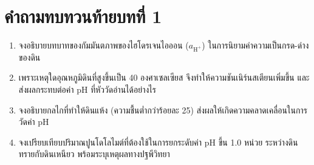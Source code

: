 \section*{คำถามทบทวนท้ายบทที่ 1}

\begin{enumerate}
    \item จงอธิบายบทบาทของกัมมันตภาพของไฮโดรเจนไอออน ($a_{\text{H}^+}$) ในการนิยามค่าความเป็นกรด-ด่างของดิน
    \item เพราะเหตุใดอุณหภูมิดินที่สูงขึ้นเป็น 40 องศาเซลเซียส จึงทำให้ความชันเนิร์นสเตียนเพิ่มขึ้น และส่งผลกระทบต่อค่า pH ที่หัววัดอ่านได้อย่างไร
    \item จงอธิบายกลไกที่ทำให้ดินแห้ง (ความชื้นต่ำกว่าร้อยละ 25) ส่งผลให้เกิดความคลาดเคลื่อนในการวัดค่า pH
    \item จงเปรียบเทียบปริมาณปูนโดโลไมต์ที่ต้องใช้ในการยกระดับค่า pH ขึ้น 1.0 หน่วย ระหว่างดินทรายกับดินเหนียว พร้อมระบุเหตุผลทางปฐพีวิทยา
\end{enumerate}
